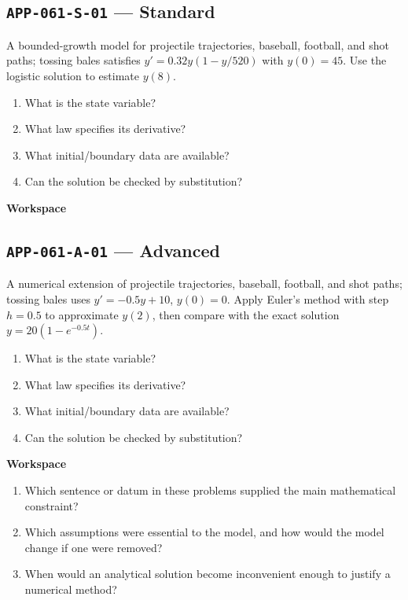 \documentclass[11pt]{book}
\newcommand{\pid}[1]{\texttt{#1}}
\newcommand{\workspace}{\par\vspace{0.7in}\hrulefill\par\vspace{0.55in}\hrulefill\par}
\begin{document}
\subsection*{\pid{APP-061-S-01} — Standard}
\begin{problembox}
A bounded-growth model for projectile trajectories, baseball, football, and shot paths; tossing bales satisfies $y'=0.32y(1-y/520)$ with $y(0)=45$. Use the logistic solution to estimate $y(8)$.
\end{problembox}
\begin{promptbox}\begin{enumerate}
\item What is the state variable?
\item What law specifies its derivative?
\item What initial/boundary data are available?
\item Can the solution be checked by substitution?
\end{enumerate}\end{promptbox}
\textbf{Workspace}\workspace
{}
\subsection*{\pid{APP-061-A-01} — Advanced}
\begin{problembox}
A numerical extension of projectile trajectories, baseball, football, and shot paths; tossing bales uses $y'=-0.5y+10$, $y(0)=0$. Apply Euler's method with step $h=0.5$ to approximate $y(2)$, then compare with the exact solution $y=20(1-e^{-0.5t})$.
\end{problembox}
\begin{promptbox}\begin{enumerate}
\item What is the state variable?
\item What law specifies its derivative?
\item What initial/boundary data are available?
\item Can the solution be checked by substitution?
\end{enumerate}\end{promptbox}
\textbf{Workspace}\workspace
\begin{reflectionbox}\begin{enumerate}
\item Which sentence or datum in these problems supplied the main mathematical constraint?
\item Which assumptions were essential to the model, and how would the model change if one were removed?
\item When would an analytical solution become inconvenient enough to justify a numerical method?
\end{enumerate}\end{reflectionbox}
\end{document}
